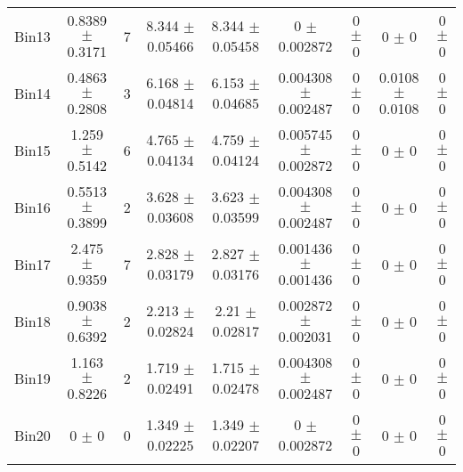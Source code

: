 \begin{tabular}{@{\extracolsep{4pt}}lcccccccc@{}}
     Bin13 & 0.8389 $\pm$ 0.3171 & 7 & 8.344 $\pm$ 0.05466 & 8.344 $\pm$ 0.05458 & 0 $\pm$ 0.002872 & 0 $\pm$ 0 & 0 $\pm$ 0 & 0 $\pm$ 0 \\ 
     Bin14 & 0.4863 $\pm$ 0.2808 & 3 & 6.168 $\pm$ 0.04814 & 6.153 $\pm$ 0.04685 & 0.004308 $\pm$ 0.002487 & 0 $\pm$ 0 & 0.0108 $\pm$ 0.0108 & 0 $\pm$ 0 \\ 
     Bin15 & 1.259 $\pm$ 0.5142 & 6 & 4.765 $\pm$ 0.04134 & 4.759 $\pm$ 0.04124 & 0.005745 $\pm$ 0.002872 & 0 $\pm$ 0 & 0 $\pm$ 0 & 0 $\pm$ 0 \\ 
     Bin16 & 0.5513 $\pm$ 0.3899 & 2 & 3.628 $\pm$ 0.03608 & 3.623 $\pm$ 0.03599 & 0.004308 $\pm$ 0.002487 & 0 $\pm$ 0 & 0 $\pm$ 0 & 0 $\pm$ 0 \\ 
     Bin17 & 2.475 $\pm$ 0.9359 & 7 & 2.828 $\pm$ 0.03179 & 2.827 $\pm$ 0.03176 & 0.001436 $\pm$ 0.001436 & 0 $\pm$ 0 & 0 $\pm$ 0 & 0 $\pm$ 0 \\ 
     Bin18 & 0.9038 $\pm$ 0.6392 & 2 & 2.213 $\pm$ 0.02824 & 2.21 $\pm$ 0.02817 & 0.002872 $\pm$ 0.002031 & 0 $\pm$ 0 & 0 $\pm$ 0 & 0 $\pm$ 0 \\ 
     Bin19 & 1.163 $\pm$ 0.8226 & 2 & 1.719 $\pm$ 0.02491 & 1.715 $\pm$ 0.02478 & 0.004308 $\pm$ 0.002487 & 0 $\pm$ 0 & 0 $\pm$ 0 & 0 $\pm$ 0 \\ 
     Bin20 & 0 $\pm$ 0 & 0 & 1.349 $\pm$ 0.02225 & 1.349 $\pm$ 0.02207 & 0 $\pm$ 0.002872 & 0 $\pm$ 0 & 0 $\pm$ 0 & 0 $\pm$ 0 \\ 
\hline\hline
  \end{tabular}
